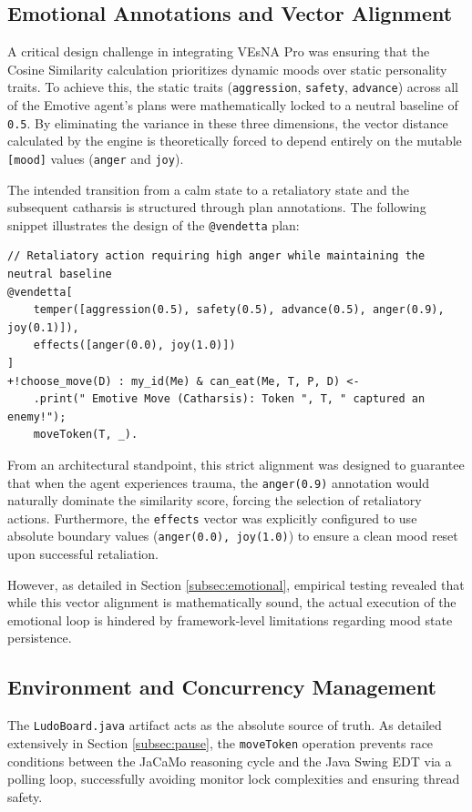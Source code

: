 \documentclass[12pt]{article}
\begin{document}
\subsection{Emotional Annotations and Vector Alignment}
\label{subsec:code_agents}
\noindent A critical design challenge in integrating VEsNA Pro was ensuring that the Cosine Similarity calculation prioritizes dynamic moods over static personality traits. To achieve this, the static traits (\texttt{aggression}, \texttt{safety}, \texttt{advance}) across all of the Emotive agent's plans were mathematically locked to a neutral baseline of \texttt{0.5}. By eliminating the variance in these three dimensions, the vector distance calculated by the engine is theoretically forced to depend entirely on the mutable \texttt{[mood]} values (\texttt{anger} and \texttt{joy}).

\noindent The intended transition from a calm state to a retaliatory state and the subsequent catharsis is structured through plan annotations. The following snippet illustrates the design of the \texttt{@vendetta} plan:

\begin{verbatim}
// Retaliatory action requiring high anger while maintaining the neutral baseline
@vendetta[
    temper([aggression(0.5), safety(0.5), advance(0.5), anger(0.9), joy(0.1)]),
    effects([anger(0.0), joy(1.0)]) 
]
+!choose_move(D) : my_id(Me) & can_eat(Me, T, P, D) <-
    .print(" Emotive Move (Catharsis): Token ", T, " captured an enemy!");
    moveToken(T, _).
\end{verbatim}

\noindent From an architectural standpoint, this strict alignment was designed to guarantee that when the agent experiences trauma, the \texttt{anger(0.9)} annotation would naturally dominate the similarity score, forcing the selection of retaliatory actions. Furthermore, the \texttt{effects} vector was explicitly configured to use absolute boundary values (\texttt{anger(0.0), joy(1.0)}) to ensure a clean mood reset upon successful retaliation. 

\noindent However, as detailed in Section \ref{subsec:emotional}, empirical testing revealed that while this vector alignment is mathematically sound, the actual execution of the emotional loop is hindered by framework-level limitations regarding mood state persistence.
\subsection{Environment and Concurrency Management}
\label{subsec:code_env}
\noindent The \texttt{LudoBoard.java} artifact acts as the absolute source of truth. As detailed extensively in Section \ref{subsec:pause}, the \texttt{moveToken} operation prevents race conditions between the JaCaMo reasoning cycle and the Java Swing EDT via a polling loop, successfully avoiding monitor lock complexities and ensuring thread safety.
\end{document}

